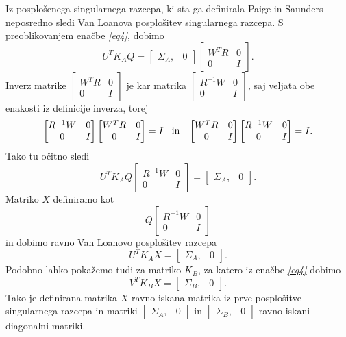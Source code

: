\documentclass[mat1]{article}
\begin{document}
Iz posplošenega singularnega razcepa, ki sta ga definirala Paige in Saunders neposredno sledi Van Loanova posplošitev singularnega razcepa. 
S preoblikovanjem enačbe \textit{\eqref{eq4}}, dobimo
$$U^T K_A Q = \left[\begin{array}{cc} \Sigma_A, & 0 \end{array}\right]
\begin{bmatrix}
W^TR & 0 \\
0 & I 
\end{bmatrix} \text{.}$$
Inverz matrike
$\begin{bmatrix}
W^TR & 0 \\
0 & I 
\end{bmatrix} $
je kar matrika 
$\begin{bmatrix}
R^{-1} W & 0 \\
0 & I 
\end{bmatrix} \text{,}$
saj veljata obe enakosti iz definicije inverza, torej
$$\begin{bmatrix}
R^{-1} W & 0 \\
0 & I 
\end{bmatrix}
\begin{bmatrix}
W^TR & 0 \\
0 & I 
\end{bmatrix}
= I \hspace{3mm}\text{in} \hspace{3mm}
\begin{bmatrix}
W^TR & 0 \\
0 & I 
\end{bmatrix}
\begin{bmatrix}
R^{-1} W & 0 \\
0 & I 
\end{bmatrix}
= I \text{.}$$
Tako tu očitno sledi
$$ U^T K_A Q
\begin{bmatrix}
R^{-1} W & 0 \\
0 & I 
\end{bmatrix}
=
\left[\begin{array}{cc} \Sigma_A, & 0 \end{array}\right] \text{.}
$$
Matriko $X$ definiramo kot
$$ Q
\begin{bmatrix}
R^{-1} W & 0 \\
0 & I 
\end{bmatrix}
$$ in dobimo ravno Van Loanovo posplošitev razcepa
$$ U^T K_A X = \left[\begin{array}{cc} \Sigma_A, & 0 \end{array}\right] \text{.}
$$
Podobno lahko pokažemo tudi za matriko $K_B$, za katero iz enačbe \textit{\eqref{eq4}} dobimo
$$ V^T K_B X = \left[\begin{array}{cc} \Sigma_B, & 0 \end{array}\right] \text{.}
$$
Tako je definirana matrika $X$ ravno iskana matrika iz prve posplošitve singularnega razcepa in matriki $\left[\begin{array}{cc} \Sigma_A, & 0 \end{array}\right]$ in $\left[\begin{array}{cc} \Sigma_B, & 0 \end{array}\right]$ ravno iskani diagonalni matriki.
\end{document}
